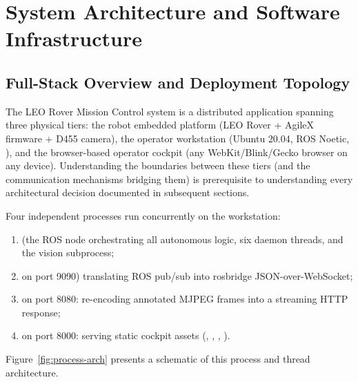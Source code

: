 \chapter{System Architecture and Software Infrastructure}
\label{ch:methodology}

\section{Full-Stack Overview and Deployment Topology}

The LEO Rover Mission Control system is a distributed application spanning three physical tiers: the robot embedded platform (LEO Rover + AgileX firmware + D455 camera), the operator workstation (Ubuntu 20.04, ROS Noetic, ), and the browser-based operator cockpit (any WebKit/Blink/Gecko browser on any device). Understanding the boundaries between these tiers (and the communication mechanisms bridging them) is prerequisite to understanding every architectural decision documented in subsequent sections.

Four independent processes run concurrently on the workstation:
\begin{enumerate}[leftmargin=1.6em]
  \item {} (the ROS node orchestrating all autonomous logic, six daemon threads, and the vision subprocess;
  \item {} on port 9090) translating ROS pub/sub into rosbridge JSON-over-WebSocket;
  \item {} on port 8080: re-encoding annotated MJPEG frames into a streaming HTTP response;
  \item {} on port 8000: serving static cockpit assets (, , , ).
\end{enumerate}

Figure~\ref{fig:process-arch} presents a schematic of this process and thread architecture.

